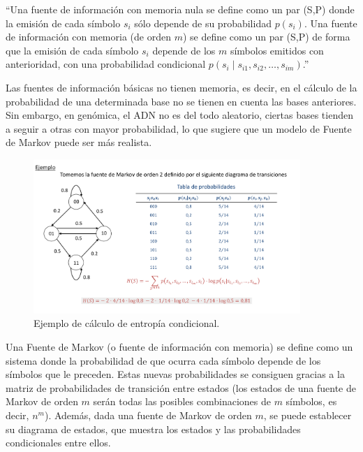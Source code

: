 \documentclass[11pt,spanish,listoffigures,listoftables]{tfgetsinf}
\begin{document}
“Una fuente de información con memoria nula se define como un par (S,P) donde la emisión de cada símbolo \( s_i \) sólo depende de su probabilidad \( p(s_i) \). Una fuente de información con memoria (de orden \( m \)) se define como un par (S,P) de forma que la emisión de cada símbolo \( s_i \) depende de los \( m \) símbolos emitidos con anterioridad, con una probabilidad condicional \( p(s_i \mid s_{i1}, s_{i2}, \dots, s_{im}) \).”\cite[p.~19]{ROB}

Las fuentes de información básicas no tienen memoria, es decir, en el cálculo de la probabilidad de una determinada base no se tienen en cuenta las bases anteriores. Sin embargo, en genómica, el ADN no es del todo aleatorio, ciertas bases tienden a seguir a otras con mayor probabilidad, lo que sugiere que un modelo de Fuente de Markov puede ser más realista. 

\begin{figure}[H]
   \centering
   \includegraphics[width=0.9\textwidth]{entropia_markov.png}
   \caption{Ejemplo de cálculo de entropía condicional.}
   \label{fig:etiqueta_opcional}
\end{figure}


Una Fuente de Markov (o fuente de información con memoria) se define como un sistema donde la probabilidad de que ocurra cada símbolo depende de los símbolos que le preceden. Estas nuevas probabilidades se consiguen gracias a la matriz de probabilidades de transición entre estados (los estados de una fuente de Markov de orden \( m \) serán todas las posibles combinaciones de \( m \) símbolos, es decir, \( n^m \)). Además, dada una fuente de Markov de orden \( m \), se puede establecer su diagrama de estados, que muestra los estados y las probabilidades condicionales entre ellos\cite[p.~20]{ROB}.
\end{document}
